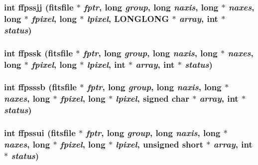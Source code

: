 \subsubsection{\setlength{\rightskip}{0pt plus 5cm}int ffpssjj (\bf{fitsfile} $\ast$ {\em fptr}, long {\em group}, long {\em naxis}, long $\ast$ {\em naxes}, long $\ast$ {\em fpixel}, long $\ast$ {\em lpixel}, \bf{LONGLONG} $\ast$ {\em array}, int $\ast$ {\em status})}\label{test_2roimasker_2fitsio_8h_f77af8b17c852fc01b279669bc4d1331}


\subsubsection{\setlength{\rightskip}{0pt plus 5cm}int ffpssk (\bf{fitsfile} $\ast$ {\em fptr}, long {\em group}, long {\em naxis}, long $\ast$ {\em naxes}, long $\ast$ {\em fpixel}, long $\ast$ {\em lpixel}, int $\ast$ {\em array}, int $\ast$ {\em status})}\label{test_2roimasker_2fitsio_8h_07580d14729935ae3509602b651e7449}


\subsubsection{\setlength{\rightskip}{0pt plus 5cm}int ffpsssb (\bf{fitsfile} $\ast$ {\em fptr}, long {\em group}, long {\em naxis}, long $\ast$ {\em naxes}, long $\ast$ {\em fpixel}, long $\ast$ {\em lpixel}, signed char $\ast$ {\em array}, int $\ast$ {\em status})}\label{test_2roimasker_2fitsio_8h_169a2bd7cc6b4306fac13a357df4dcf0}


\subsubsection{\setlength{\rightskip}{0pt plus 5cm}int ffpssui (\bf{fitsfile} $\ast$ {\em fptr}, long {\em group}, long {\em naxis}, long $\ast$ {\em naxes}, long $\ast$ {\em fpixel}, long $\ast$ {\em lpixel}, unsigned short $\ast$ {\em array}, int $\ast$ {\em status})}\label{test_2roimasker_2fitsio_8h_f72bb4b9e6bf54650b3442d4fe08e50a}


